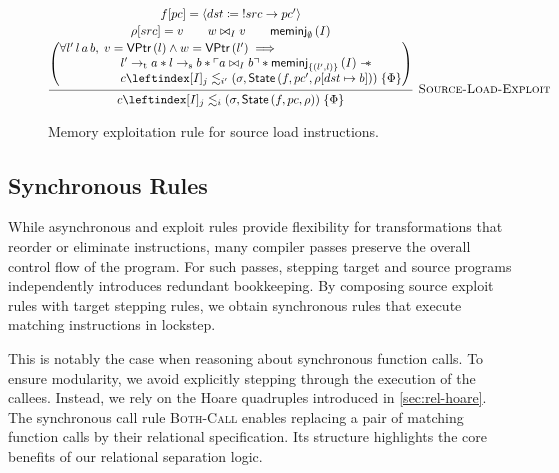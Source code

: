\documentclass[report.tex]{subfiles}
\begin{document}
\begin{figure}[htp]
  \begin{equation*}
    \begin{prooftree}
      \hypo{
        \begin{matrix}
          \pcatis{f}{pc}{\Iload{dst}{src}{pc'}}
          \\[.2em]
          {
          \getreg{src}{\rho} = v
          \qquad
          \sameval{I}{w}{v}
          \qquad
          \meminj{I}{\emptyset}
          }
          \\[.2em]
          \left(
          \begin{array}{@{}l@{}}
            \forall l'\, l\, a\, b,\;
            v = \VPtr{l} \land
            w = \VPtr{l'} \implies {}
            \\
            \hspace{5em}
            \ptrt{l'}{a} \sep
            \ptrs{l}{b} \sep
            \purel{\sameval{I}{a}{b}} \sep
            \meminj{I}{\{ (l', l)\}} \wand {}
            \\
            \hspace{5em}
            \fsim{c}{j}{i'}
            {(\sigma, \State{f}{pc'}{\setreg{dst}{b}{\rho}})}{\Phi}
          \end{array}
          \right)
        \end{matrix}
      }
      \infer1[\textsc{Source-Load-Exploit}]{
        \fsim{c}{j}{i}{(\sigma, \State{f}{pc}{\rho})}{\Phi}
      }
    \end{prooftree}
  \end{equation*}
  \caption{Memory exploitation rule for source load instructions.}
  \label{fig:source-load-exploit}
\end{figure}

\subsection{Synchronous Rules}

While asynchronous and exploit rules provide flexibility for transformations
that reorder or eliminate instructions,
many compiler passes preserve the overall control flow of the program.
For such passes,
stepping target and source programs independently introduces redundant
bookkeeping.
By composing source exploit rules with target stepping rules,
we obtain synchronous rules that execute matching instructions
in lockstep.

This is notably the case when reasoning about synchronous function calls.
To ensure modularity,
we avoid explicitly stepping through the execution of the callees.
Instead,
we rely on the Hoare quadruples introduced in \cref{sec:rel-hoare}.
The synchronous call rule \textsc{Both-Call} enables replacing a pair of
matching function calls by their relational specification.
Its structure highlights the core benefits of our relational separation logic.
\end{document}
